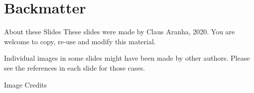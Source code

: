 \section{Backmatter}
\begin{frame}{About these Slides}
  These slides were made by Claus Aranha, 2020. You are welcome to copy, re-use and modify this material.
  \bigskip

  Individual images in some slides might have been made by other
  authors. Please see the references in each slide for those cases.
\end{frame}

\begin{frame}[allowframebreaks]{Image Credits}
  \printnotes
\end{frame}
